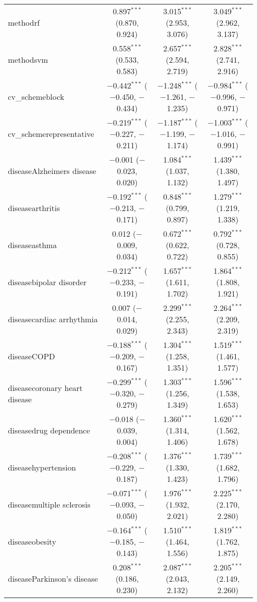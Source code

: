 \begin{table}[!htbp]
\begin{tabular}{@{\extracolsep{5pt}}lccc}
  methodrf & 0.897$^{***}$ (0.870, 0.924) & 3.015$^{***}$ (2.953, 3.076) & 3.049$^{***}$ (2.962, 3.137) \\ 
  methodsvm & 0.558$^{***}$ (0.533, 0.583) & 2.657$^{***}$ (2.594, 2.719) & 2.828$^{***}$ (2.741, 2.916) \\ 
  cv\_schemeblock & $-$0.442$^{***}$ ($-$0.450, $-$0.434) & $-$1.248$^{***}$ ($-$1.261, $-$1.235) & $-$0.984$^{***}$ ($-$0.996, $-$0.971) \\ 
  cv\_schemerepresentative & $-$0.219$^{***}$ ($-$0.227, $-$0.211) & $-$1.187$^{***}$ ($-$1.199, $-$1.174) & $-$1.003$^{***}$ ($-$1.016, $-$0.991) \\ 
  diseaseAlzheimers disease & $-$0.001 ($-$0.023, 0.020) & 1.084$^{***}$ (1.037, 1.132) & 1.439$^{***}$ (1.380, 1.497) \\ 
  diseasearthritis & $-$0.192$^{***}$ ($-$0.213, $-$0.171) & 0.848$^{***}$ (0.799, 0.897) & 1.279$^{***}$ (1.219, 1.338) \\ 
  diseaseasthma & 0.012 ($-$0.009, 0.034) & 0.672$^{***}$ (0.622, 0.722) & 0.792$^{***}$ (0.728, 0.855) \\ 
  diseasebipolar disorder & $-$0.212$^{***}$ ($-$0.233, $-$0.191) & 1.657$^{***}$ (1.611, 1.702) & 1.864$^{***}$ (1.808, 1.921) \\ 
  diseasecardiac arrhythmia & 0.007 ($-$0.014, 0.029) & 2.299$^{***}$ (2.255, 2.343) & 2.264$^{***}$ (2.209, 2.319) \\ 
  diseaseCOPD & $-$0.188$^{***}$ ($-$0.209, $-$0.167) & 1.304$^{***}$ (1.258, 1.351) & 1.519$^{***}$ (1.461, 1.577) \\ 
  diseasecoronary heart disease & $-$0.299$^{***}$ ($-$0.320, $-$0.279) & 1.303$^{***}$ (1.256, 1.349) & 1.596$^{***}$ (1.538, 1.653) \\ 
  diseasedrug dependence & $-$0.018 ($-$0.039, 0.004) & 1.360$^{***}$ (1.314, 1.406) & 1.620$^{***}$ (1.562, 1.678) \\ 
  diseasehypertension & $-$0.208$^{***}$ ($-$0.229, $-$0.187) & 1.376$^{***}$ (1.330, 1.423) & 1.739$^{***}$ (1.682, 1.796) \\ 
  diseasemultiple sclerosis & $-$0.071$^{***}$ ($-$0.093, $-$0.050) & 1.976$^{***}$ (1.932, 2.021) & 2.225$^{***}$ (2.170, 2.280) \\ 
  diseaseobesity & $-$0.164$^{***}$ ($-$0.185, $-$0.143) & 1.510$^{***}$ (1.464, 1.556) & 1.819$^{***}$ (1.762, 1.875) \\ 
  diseaseParkinson's disease & 0.208$^{***}$ (0.186, 0.230) & 2.087$^{***}$ (2.043, 2.132) & 2.205$^{***}$ (2.149, 2.260) \\ 

\end{tabular}
\end{table}

